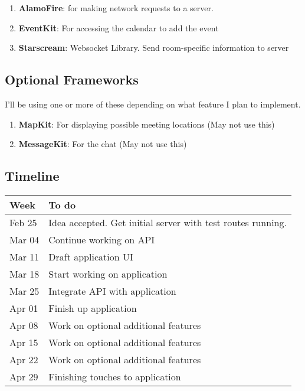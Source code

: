 \documentclass[11pt]{article}
\begin{document}
\begin{enumerate}
\item \textbf{AlamoFire}: for making network requests to a server.
\item \textbf{EventKit}: For accessing the calendar to add the event
\item \textbf{Starscream}: Websocket Library. Send room-specific information to server
\end{enumerate}

\subsection{Optional Frameworks}
\label{sec:org99c91b8}

I'll be using one or more of these depending on what feature I plan to implement. 

\begin{enumerate}
\item \textbf{MapKit}: For displaying possible meeting locations (May not use this)
\item \textbf{MessageKit}: For the chat (May not use this)
\end{enumerate}

\subsection{Timeline}
\label{sec:orgc2272d4}

\begin{center}
\begin{tabular}{ll}
Week & To do\\
\hline
Feb 25 & Idea accepted. Get initial server with test routes running.\\
Mar 04 & Continue working on API\\
Mar 11 & Draft application UI\\
Mar 18 & Start working on application\\
Mar 25 & Integrate API with application\\
Apr 01 & Finish up application\\
Apr 08 & Work on optional additional features\\
Apr 15 & Work on optional additional features\\
Apr 22 & Work on optional additional features\\
Apr 29 & Finishing touches to application\\
\end{tabular}
\end{center}
\end{document}
